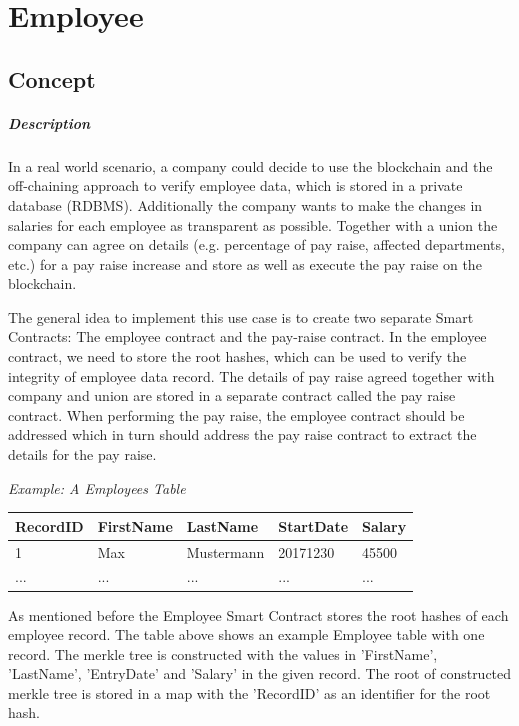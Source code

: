 \section{Employee}
\subsection{Concept}
\subparagraph{Description}
In a real world scenario, a company could decide to use the blockchain and the off-chaining approach to verify employee data, which is stored in a private database (RDBMS). Additionally the company wants to make the changes in salaries for each employee as transparent as possible. Together with a union the company can agree on details (e.g. percentage of pay raise, affected departments, etc.) for a pay raise increase and store as well as execute the pay raise on the blockchain.

The general idea to implement this use case is to create two separate Smart Contracts: The employee contract and the pay-raise contract. In the employee contract, we need to store the root hashes, which can be used to verify the integrity of employee data record. The details of pay raise agreed together with company and union are stored in a separate contract called the pay raise contract. When performing the pay raise, the employee contract should be addressed which in turn should address the pay raise contract to extract the details for the pay raise.


\textit{Example: A Employees Table}
\begin{center}
    \begin{tabular}{| l | l | l | l | l |}
    \hline
    RecordID & FirstName & LastName & StartDate & Salary \\ \hline
    1 & Max & Mustermann & 20171230 & 45500 \\ \hline
    ... & ... & ... & ... & ... \\ \hline
    \end{tabular}
\end{center}

As mentioned before the Employee Smart Contract stores the root hashes of each employee record. The table above shows an example Employee table with one record. The merkle tree is constructed with the values in 'FirstName', 'LastName', 'EntryDate' and 'Salary' in the given record. The root of constructed merkle tree is stored in a map with the 'RecordID' as an identifier for the root hash.

